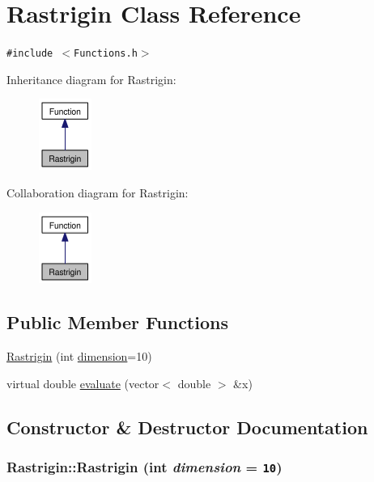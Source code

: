 \hypertarget{classRastrigin}{
\section{Rastrigin Class Reference}
\label{classRastrigin}
}
{\tt \#include $<$Functions.h$>$}

Inheritance diagram for Rastrigin:\nopagebreak
\begin{figure}[H]
\begin{center}
\leavevmode
\includegraphics[width=49pt]{classRastrigin__inherit__graph}
\end{center}
\end{figure}
Collaboration diagram for Rastrigin:\nopagebreak
\begin{figure}[H]
\begin{center}
\leavevmode
\includegraphics[width=49pt]{classRastrigin__coll__graph}
\end{center}
\end{figure}
\subsection*{Public Member Functions}
\begin{CompactItemize}
\item 
\hyperlink{classRastrigin_3c9febfdda66a8c722f1bf2113280f20}{Rastrigin} (int \hyperlink{aco-r_8cpp_1a8a8235879363159315091a1daed72f}{dimension}=10)
\item 
virtual double \hyperlink{classRastrigin_aba8c37ab1546da6e7ed47123d179673}{evaluate} (vector$<$ double $>$ \&x)
\end{CompactItemize}


\subsection{Constructor \& Destructor Documentation}
\hypertarget{classRastrigin_3c9febfdda66a8c722f1bf2113280f20}{
\subsubsection{\setlength{\rightskip}{0pt plus 5cm}Rastrigin::Rastrigin (int {\em dimension} = {\tt 10})}}
\label{classRastrigin_3c9febfdda66a8c722f1bf2113280f20}




